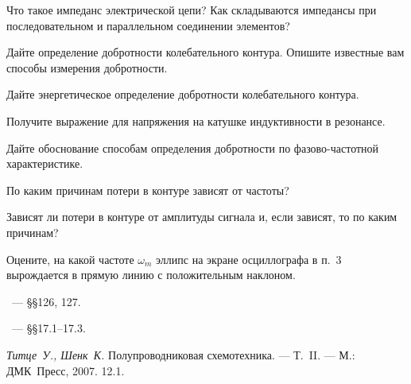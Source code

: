 \begin{lab:questions}
    \item Что такое импеданс электрической цепи?
    Как складываются импедансы при последовательном и параллельном
    соединении элементов?
    
    \item Дайте определение добротности колебательного контура.
    Опишите известные вам способы измерения добротности.
    
    \item Дайте энергетическое определение добротности колебательного контура.

    \item  Получите выражение для напряжения на катушке индуктивности  в
резонансе.

    \item Дайте обоснование способам определения добротности по
фазово-частотной характеристике.

    \item По каким причинам потери в контуре зависят от частоты?

    \item Зависят ли потери в контуре от амплитуды сигнала и, если зависят, то
по каким причинам?

    \item Оцените, на какой частоте $\omega_m$ эллипс на экране осциллографа в
п.~3 вырождается в прямую линию с положительным наклоном.
\end{lab:questions}


\begin{lab:literature}
        \item \SivuhinIII~--- \S\S126, 127.
        \item \Kirichenko~--- \S\S17.1--17.3.
    \item \emph{Титце~У., Шенк~К.} Полупроводниковая схемотехника.  --- Т.~II. ---
М.: ДМК~Пресс, 2007. 12.1.
\end{lab:literature}

